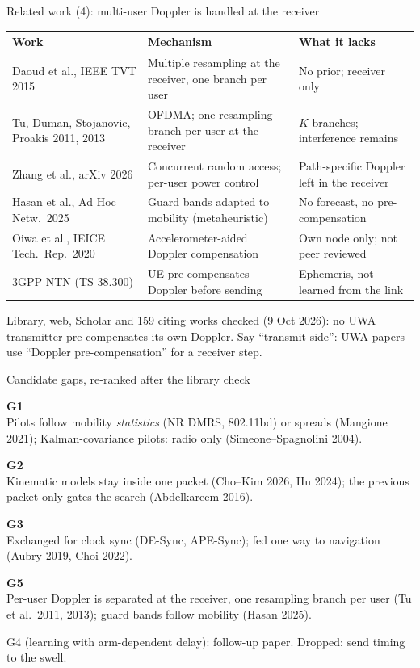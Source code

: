 \documentclass[aspectratio=169,11pt]{beamer}
\newcommand{\gapbox}[3]{%
  \begin{tcolorbox}[colback=foam!60,colframe=foam!60,arc=2mm,boxrule=0pt,left=2mm,right=2mm,top=0.6mm,bottom=0.6mm,before skip=0.8mm,after skip=0.8mm]
  {\bfseries\color{teal}#1}\hspace{1mm}{\small\bfseries #2}\\
  {\footnotesize #3}
  \end{tcolorbox}}
\begin{document}
\begin{frame}{Related work (4): multi-user Doppler is handled at the receiver}
\scriptsize\setlength{\tabcolsep}{3pt}\renewcommand{\arraystretch}{0.92}
\begin{tabular}{@{}L{0.33\textwidth}L{0.33\textwidth}L{0.30\textwidth}@{}}
\toprule
\textbf{Work} & \textbf{Mechanism} & \textbf{What it lacks}\\
\midrule
Daoud et al., IEEE TVT 2015 & Multiple resampling at the receiver, one branch per user & No prior; receiver only\\
Tu, Duman, Stojanovic, Proakis 2011, 2013 & OFDMA; one resampling branch per user at the receiver & $K$ branches; interference remains\\
Zhang et al., arXiv 2026 & Concurrent random access; per-user power control & Path-specific Doppler left in the receiver\\
Hasan et al., Ad Hoc Netw.\ 2025 & Guard bands adapted to mobility (metaheuristic) & No forecast, no pre-compensation\\
Oiwa et al., IEICE Tech.\ Rep.\ 2020 & Accelerometer-aided Doppler compensation & Own node only; not peer reviewed\\
3GPP NTN (TS 38.300) & UE pre-compensates Doppler before sending & Ephemeris, not learned from the link\\
\bottomrule
\end{tabular}

\vspace{1mm}
\footnotesize Library, web, Scholar and 159 citing works checked (9 Oct 2026): no UWA transmitter pre-compensates its own Doppler. Say ``transmit-side'': UWA papers use ``Doppler pre-compensation'' for a receiver step.
\end{frame}

\begin{frame}{Candidate gaps, re-ranked after the library check}
\gapbox{G1}{No packet places training from the error variance of a kinematic Doppler forecast}{Pilots follow mobility \emph{statistics} (NR DMRS, 802.11bd) or spreads (Mangione 2021); Kalman-covariance pilots: radio only (Simeone--Spagnolini 2004).}
\gapbox{G2}{No receiver carries a Doppler forecast with uncertainty across packets}{Kinematic models stay inside one packet (Cho--Kim 2026, Hu 2024); the previous packet only gates the search (Abdelkareem 2016).}
\gapbox{G3}{Doppler from both ends is not tracked as a kinematic process for the link}{Exchanged for clock sync (DE-Sync, APE-Sync); fed one way to navigation (Aubry 2019, Choi 2022).}
\gapbox{G5}{No UWA transmitter pre-compensates Doppler for a multi-user uplink}{Per-user Doppler is separated at the receiver, one resampling branch per user (Tu et al.\ 2011, 2013); guard bands follow mobility (Hasan 2025).}
{\tiny\color{mute} G4 (learning with arm-dependent delay): follow-up paper. Dropped: send timing to the swell.}
\end{frame}
\end{document}
